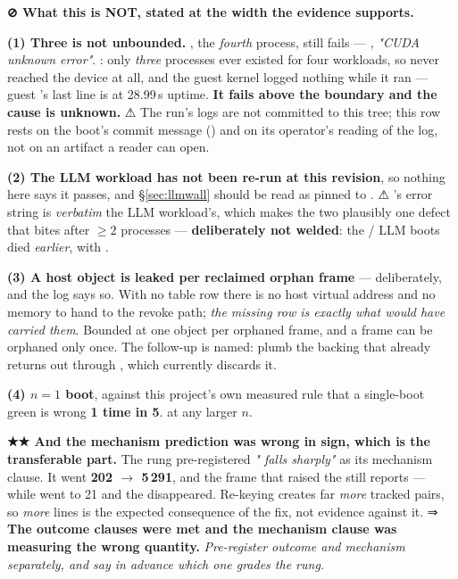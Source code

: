 \documentclass[10.5pt]{article}
\begin{document}
\begin{claimbox}\small
\textbf{⊘ What this is NOT, stated at the width the evidence supports.}

\smallskip
\textbf{(1) Three is not unbounded.} , the \emph{fourth} process, still fails ---
, \emph{"CUDA unknown error"}. \measured{} : only \emph{three}
processes ever existed for four workloads, so  never reached the device at all, and the
guest kernel logged nothing while it ran --- guest 's last line is at 28.99\,s uptime.
\textbf{It fails above the  boundary and the cause is unknown.} ⚠ The 
run's logs are not committed to this tree; this row rests on the boot's commit message
() and on its operator's reading of the log, not on an artifact a reader can open.

\smallskip
\textbf{(2) The LLM workload has not been re-run at this revision}, so nothing here says it
passes, and \S\ref{sec:llmwall} should be read as pinned to . ⚠ 's error
string is \emph{verbatim} the LLM workload's, which makes the two plausibly one defect that bites
after $\geq 2$ processes --- \textbf{deliberately not welded}: the / LLM
boots died \emph{earlier}, with .

\smallskip
\textbf{(3) A host object is leaked per reclaimed orphan frame} --- deliberately, and the log says
so. With no table row there is no host virtual address and no memory to hand to the revoke path;
\emph{the missing row is exactly what would have carried them}. Bounded at one object per orphaned
frame, and a frame can be orphaned only once. The follow-up is named: plumb the backing that
 already returns out through ,
which currently discards it.

\smallskip
\textbf{(4) $n = 1$ boot}, against this project's own measured rule that a single-boot green is
wrong \textbf{1 time in 5}. \unver{} at any larger $n$.
\end{claimbox}

\begin{claimbox}\small
\textbf{★★ And the mechanism prediction was wrong in sign, which is the transferable part.} The
rung pre-registered \emph{" falls sharply"} as its mechanism clause. It went
\textbf{202 $\rightarrow$ 5\,291}, and the frame that raised the  still reports
 --- while  went to 21 and the   disappeared.
Re-keying creates far \emph{more} tracked pairs, so \emph{more}  lines is the
expected consequence of the fix, not evidence against it. ⇒ \textbf{The outcome clauses were met
and the mechanism clause was measuring the wrong quantity.} \emph{Pre-register outcome and
mechanism separately, and say in advance which one grades the rung.}
\end{claimbox}
\end{document}
